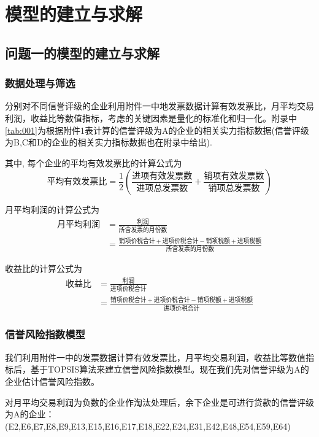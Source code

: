 \documentclass{cumcmthesis}
\begin{document}
\section{模型的建立与求解}
\subsection{问题一的模型的建立与求解}

\subsubsection{数据处理与筛选}
分别对不同信誉评级的企业利用附件一中地发票数据计算有效发票比，月平均交易利润，收益比等数值指标，考虑的关键因素是量化的标准化和归一化。附录中\cref{tab:001}为根据附件1表计算的信誉评级为A的企业的相关实力指标数据(信誉评级为B,C和D的企业的相关实力指标数据也在附录中给出).

其中, 每个企业的平均有效发票比的计算公式为
\begin{equation}
\mbox{平均有效发票比}=\frac{1}{2}(\frac{\mbox{进项有效发票数}}{\mbox{进项总发票数}}+\frac{\mbox{销项有效发票数}}{\mbox{销项总发票数}})
\end{equation}

月平均利润的计算公式为
\begin{align}
\mbox{月平均利润} &= \frac{\mbox{利润}}{\mbox{所含发票的月份数}}\\
                 &= \frac{\mbox{销项价税合计}+\mbox{进项价税合计}-\mbox{销项税额}+\mbox{进项税额}}{\mbox{所含发票的月份数}}
\end{align}

收益比的计算公式为
\begin{align}
\mbox{收益比} &= \frac{\mbox{利润}}{\mbox{进项价税合计}} \\
             &=\frac{\mbox{销项价税合计}+\mbox{进项价税合计}-\mbox{销项税额}+\mbox{进项税额}}{\mbox{进项价税合计}}
\end{align}

\subsubsection{信誉风险指数模型}
我们利用附件一中的发票数据计算有效发票比，月平均交易利润，收益比等数值指标后，基于TOPSIS算法来建立信誉风险指数模型。现在我们先对信誉评级为A的企业估计信誉风险指数。

对月平均交易利润为负数的企业作淘汰处理后，余下企业是可进行贷款的信誉评级为A的企业：(E2,E6,E7,E8,E9,E13,E15,E16,E17,E18,E22,E24,E31,E42,E48,E54,E59,E64)
\end{document}
